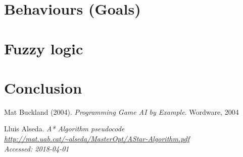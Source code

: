 \documentclass[11pt]{article}
\begin{document}
    \section{Behaviours (Goals)}\label{sec:behaviour}
    
    
    \newpage
    \section{Fuzzy logic}\label{sec:fuzzyLogic}

    \newpage
    \section{Conclusion}\label{sec:conclusion}
    
    \newpage

    \begin{thebibliography}{9}
        Mat Buckland (2004).
        \textit{Programming Game AI by Example}.
        Wordware, 2004

        Lluis Alseda.
        \textit{A* Algorithm pseudocode}
        \\\textit{\url{http://mat.uab.cat/~alseda/MasterOpt/AStar-Algorithm.pdf}}
        \\\textit{Accessed: 2018-04-01}
    \end{thebibliography}
\end{document}
